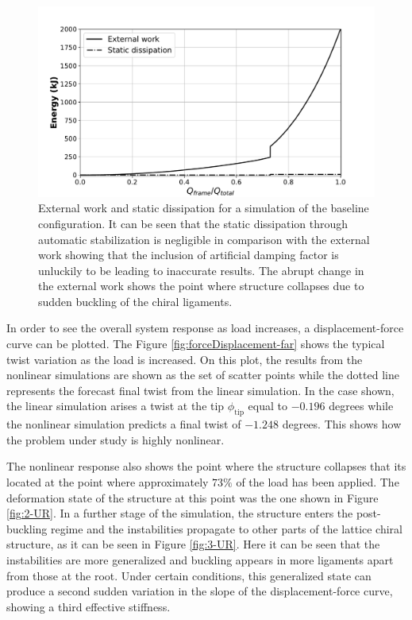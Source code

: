   \begin{figure}[!htpb] %
    \centering
    \includegraphics[width=0.8 \textwidth]{figures/../figures/result-sim/energy}
    \caption[External work and static dissipation for a simulation of the baseline configuration]{External work and static dissipation for a simulation of the baseline configuration. It can be seen that the static dissipation through automatic stabilization is negligible in comparison with the external work showing that the inclusion of artificial damping factor is unluckily to be leading to inaccurate results. The abrupt change in the external work shows the point where structure collapses due to sudden buckling of the chiral ligaments.}\label{fig:energy}
  \end{figure}

  In order to see the overall system response as load increases, a displacement-force curve can be plotted. The Figure \ref{fig:forceDisplacement-far} shows the typical twist variation as the load is increased. On this plot, the results from the nonlinear simulations are shown as the set of scatter points while the dotted line represents the forecast final twist from the linear simulation. In the case shown, the linear simulation arises a twist at the tip $\phi_{\mathrm{tip}}$ equal to $-0.196$ degrees while the nonlinear simulation predicts a final twist of $-1.248$ degrees. This shows how the problem under study is highly nonlinear.

  The nonlinear response also shows the point where the structure collapses that its located at the point where approximately $73\%$ of the load has been applied. The deformation state of the structure at this point was the one shown in Figure \ref{fig:2-UR}. In a further stage of the simulation, the structure enters the post-buckling regime and the instabilities propagate to other parts of the lattice chiral structure, as it can be seen in Figure \ref{fig:3-UR}. Here it can be seen that the instabilities are more generalized and buckling appears in more ligaments apart from those at the root. Under certain conditions, this generalized state can produce a second sudden variation in the slope of the displacement-force curve, showing a third effective stiffness. 

